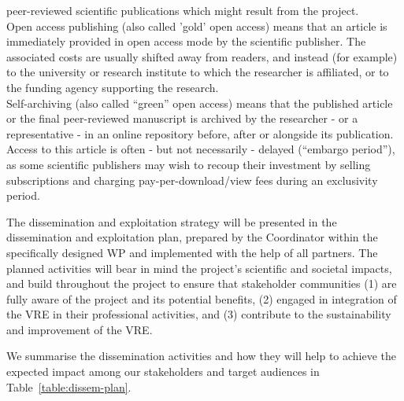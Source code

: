 {peer-reviewed scientific publications which might result from the project.\\
Open access publishing (also called 'gold' open access) means that an article is
immediately provided in open access mode by the scientific publisher. The associated costs
are usually shifted away from readers, and instead (for example) to the university or
research institute to which the researcher is affiliated, or to the funding agency supporting
the research.\\
Self-archiving (also called ``green'' open access) means that the published article or the
final peer-reviewed manuscript is archived by the researcher - or a representative - in an
online repository before, after or alongside its publication. Access to this article is often -
but not necessarily - delayed (``embargo period''), as some scientific publishers may wish to
recoup their investment by selling subscriptions and charging pay-per-download/view fees
during an exclusivity period.}


The dissemination and exploitation strategy will be
presented in the dissemination and exploitation plan, prepared by the
Coordinator within  the specifically designed WP
and implemented with the help of all partners. The planned activities
will bear in mind the project's scientific and societal impacts, and
build throughout the project to ensure that stakeholder communities
(1) are fully aware of the project and its potential benefits, (2)
engaged in integration of the VRE in their professional activities,
and (3) contribute to the sustainability and improvement of the
VRE. 

We summarise the dissemination activities
and how they will help to achieve the expected impact among our
stakeholders and target audiences in Table~\ref{table:dissem-plan}.



